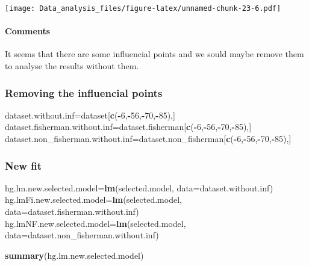 \documentclass[12pt,]{article}
\newenvironment{Shaded}{\begin{snugshade}}{\end{snugshade}}
\newcommand{\KeywordTok}[1]{\textcolor[rgb]{0.13,0.29,0.53}{\textbf{#1}}}
\newcommand{\DataTypeTok}[1]{\textcolor[rgb]{0.13,0.29,0.53}{#1}}
\newcommand{\DecValTok}[1]{\textcolor[rgb]{0.00,0.00,0.81}{#1}}
\newcommand{\OperatorTok}[1]{\textcolor[rgb]{0.81,0.36,0.00}{\textbf{#1}}}
\newcommand{\NormalTok}[1]{#1}
\let\oldparagraph\paragraph
\renewcommand{\paragraph}[1]{\oldparagraph{#1}\mbox{}}
\begin{document}
\texttt{[image: Data\_analysis\_files/figure-latex/unnamed-chunk-23-6.pdf]}

\paragraph{Comments}\label{comments-5}

It seems that there are some influencial points and we sould maybe
remove them to analyse the results without them.

\subsubsection{Removing the influencial
points}\label{removing-the-influencial-points}

\begin{Shaded}
\begin{Highlighting}[]
\NormalTok{dataset.without.inf=dataset[}\KeywordTok{c}\NormalTok{(}\OperatorTok{-}\DecValTok{6}\NormalTok{,}\OperatorTok{-}\DecValTok{56}\NormalTok{,}\OperatorTok{-}\DecValTok{70}\NormalTok{,}\OperatorTok{-}\DecValTok{85}\NormalTok{),]}
\NormalTok{dataset.fisherman.without.inf=dataset.fisherman[}\KeywordTok{c}\NormalTok{(}\OperatorTok{-}\DecValTok{6}\NormalTok{,}\OperatorTok{-}\DecValTok{56}\NormalTok{,}\OperatorTok{-}\DecValTok{70}\NormalTok{,}\OperatorTok{-}\DecValTok{85}\NormalTok{),]}
\NormalTok{dataset.non_fisherman.without.inf=dataset.non_fisherman[}\KeywordTok{c}\NormalTok{(}\OperatorTok{-}\DecValTok{6}\NormalTok{,}\OperatorTok{-}\DecValTok{56}\NormalTok{,}\OperatorTok{-}\DecValTok{70}\NormalTok{,}\OperatorTok{-}\DecValTok{85}\NormalTok{),]}
\end{Highlighting}
\end{Shaded}

\subsubsection{New fit}\label{new-fit}

\begin{Shaded}
\begin{Highlighting}[]
\NormalTok{hg.lm.new.selected.model=}\KeywordTok{lm}\NormalTok{(selected.model, }\DataTypeTok{data=}\NormalTok{dataset.without.inf)}
\NormalTok{hg.lmFi.new.selected.model=}\KeywordTok{lm}\NormalTok{(selected.model, }\DataTypeTok{data=}\NormalTok{dataset.fisherman.without.inf)}
\NormalTok{hg.lmNF.new.selected.model=}\KeywordTok{lm}\NormalTok{(selected.model, }\DataTypeTok{data=}\NormalTok{dataset.non_fisherman.without.inf)}

\KeywordTok{summary}\NormalTok{(hg.lm.new.selected.model)}
\end{Highlighting}
\end{Shaded}
\end{document}
